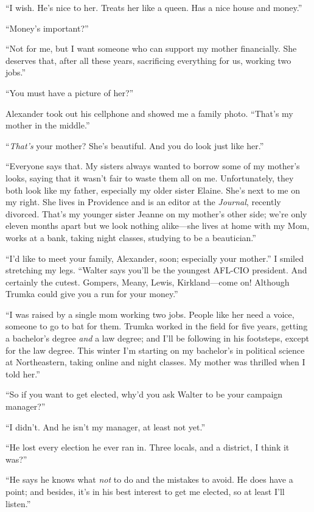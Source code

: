 ``I wish. He's nice to her. Treats her like a queen. Has a nice house
and money.''

``Money's important?''

``Not for me, but I want someone who can support my mother financially.
She deserves that, after all these years, sacrificing everything for us,
working two jobs.''

``You must have a picture of her?''

Alexander took out his cellphone and showed me a family photo. ``That's
my mother in the middle.''

``\emph{That's} your mother? She's beautiful. And you do look just like
her.''

``Everyone says that. My sisters always wanted to borrow some of my
mother's looks, saying that it wasn't fair to waste them all on me.
Unfortunately, they both look like my father, especially my older sister
Elaine. She's next to me on my right. She lives in Providence and is an
editor at the \emph{Journal}, recently divorced. That's my younger
sister Jeanne on my mother's other side; we're only eleven months apart
but we look nothing alike---she lives at home with my Mom, works at a
bank, taking night classes, studying to be a beautician.''

``I'd like to meet your family, Alexander, soon; especially your
mother.'' I smiled stretching my legs. ``Walter says you'll be the
youngest AFL-CIO president. And certainly the cutest. Gompers, Meany,
Lewis, Kirkland---come on! Although Trumka could give you a run for your
money.''

``I was raised by a single mom working two jobs. People like her need a
voice, someone to go to bat for them. Trumka worked in the field for
five years, getting a bachelor's degree \emph{and} a law degree; and
I'll be following in his footsteps, except for the law degree. This
winter I'm starting on my bachelor's in political science at
Northeastern, taking online and night classes. My mother was thrilled
when I told her.''

``So if you want to get elected, why'd you ask Walter to be your
campaign manager?''

``I didn't. And he isn't my manager, at least not yet.''

``He lost every election he ever ran in. Three locals, and a district, I
think it was?''

``He says he knows what \emph{not} to do and the mistakes to avoid. He
does have a point; and besides, it's in his best interest to get me
elected, so at least I'll listen.''

